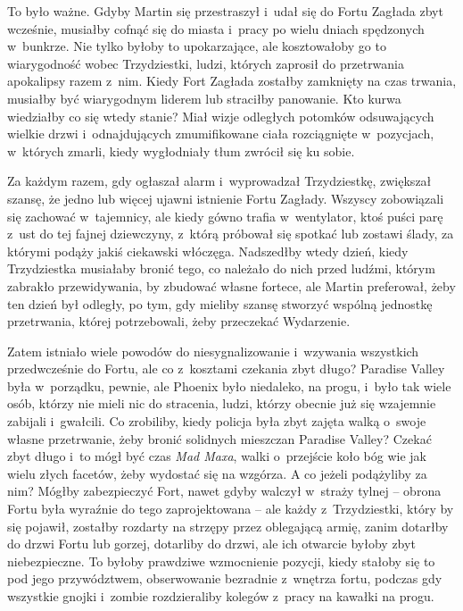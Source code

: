 \documentclass[oneside,polish,11pt,sfheadings]{mwbk}
\begin{document}
To było ważne. Gdyby Martin się przestraszył i~udał się do Fortu Zagłada
zbyt wcześnie, musiałby cofnąć się do miasta i~pracy po wielu dniach
spędzonych w~bunkrze. Nie tylko byłoby to upokarzające, ale kosztowałoby
go to wiarygodność wobec Trzydziestki, ludzi, których zaprosił do
przetrwania apokalipsy razem z~nim. Kiedy Fort Zagłada zostałby
zamknięty na czas trwania, musiałby być wiarygodnym liderem lub
straciłby panowanie. Kto kurwa wiedziałby co się wtedy stanie? Miał
wizje odległych potomków odsuwających wielkie drzwi i~odnajdujących
zmumifikowane ciała rozciągnięte w~pozycjach, w~których zmarli, kiedy
wygłodniały tłum zwrócił się ku sobie.

Za każdym razem, gdy ogłaszał alarm i~wyprowadzał Trzydziestkę,
zwiększał szansę, że jedno lub więcej ujawni istnienie Fortu Zagłady.
Wszyscy zobowiązali się zachować w~tajemnicy, ale kiedy gówno trafia w~wentylator, ktoś puści parę z~ust do tej fajnej dziewczyny, z~którą
próbował się spotkać lub zostawi ślady, za którymi podąży jakiś
ciekawski włóczęga. Nadszedłby wtedy dzień, kiedy Trzydziestka musiałaby
bronić tego, co należało do nich przed ludźmi, którym zabrakło
przewidywania, by zbudować własne fortece, ale Martin preferował, żeby
ten dzień był odległy, po tym, gdy mieliby szansę stworzyć wspólną
jednostkę przetrwania, której potrzebowali, żeby przeczekać Wydarzenie.

Zatem istniało wiele powodów do niesygnalizowanie i~wzywania wszystkich
przedwcześnie do Fortu, ale co z~kosztami czekania zbyt długo? Paradise
Valley była w~porządku, pewnie, ale Phoenix było niedaleko, na progu, i~było tak wiele osób, którzy nie mieli nic do stracenia, ludzi, którzy
obecnie już się wzajemnie zabijali i~gwałcili. Co zrobiliby, kiedy
policja była zbyt zajęta walką o~swoje własne przetrwanie, żeby bronić
solidnych mieszczan Paradise Valley? Czekać zbyt długo i~to mógł być
czas \textit{Mad Maxa}, walki o~przejście koło bóg wie jak wielu złych
facetów, żeby wydostać się na wzgórza. A co jeżeli podążyliby za nim?
Mógłby zabezpieczyć Fort, nawet gdyby walczył w~straży tylnej -- obrona
Fortu była wyraźnie do tego zaprojektowana -- ale każdy z~Trzydziestki,
który by się pojawił, zostałby rozdarty na strzępy przez oblegającą
armię, zanim dotarłby do drzwi Fortu lub gorzej, dotarliby do drzwi, ale
ich otwarcie byłoby zbyt niebezpieczne. To byłoby prawdziwe wzmocnienie
pozycji, kiedy stałoby się to pod jego przywództwem, obserwowanie
bezradnie z~wnętrza fortu, podczas gdy wszystkie gnojki i~zombie
rozdzieraliby kolegów z~pracy na kawałki na progu.
\end{document}
